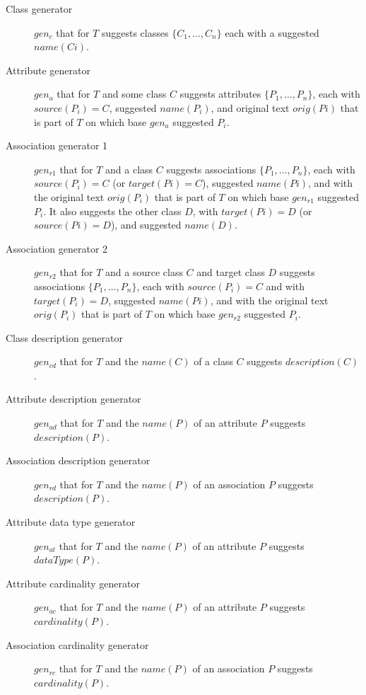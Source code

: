 \begin{description}
\item [Class generator] $gen_c$ that for $T$ suggests classes $\{C_1, \ldots, C_n\}$ each with a suggested $name(Ci)$.

\item [Attribute generator] $gen_a$ that for $T$ and some class $C$ suggests attributes $\{P_1, \ldots, P_n\}$, each with $source(P_i) = C$, suggested $name(P_i)$, and original text $orig(Pi)$ that is part of $T$ on which base $gen_a$ suggested $P_i$.

\item [Association generator 1] $gen_{r1}$ that for $T$ and a class $C$ suggests associations $\{P_1, \ldots, P_n\}$, each with $source(P_i) = C$ (or $target(Pi) = C$), suggested $name(Pi)$, and with the original text $orig(P_i)$ that is part of $T$ on which base $gen_{r1}$ suggested $P_i$. It also suggests the other class $D$, with $target(Pi)= D$ (or $source(Pi) = D$), and suggested $name(D)$.

\item [Association generator 2] $gen_{r2}$ that for $T$ and a source class $C$ and target class $D$ suggests associations $\{P_1, \ldots, P_n\}$, each with $source(P_i) = C$ and with $target(P_i) = D$, suggested $name(Pi)$, and with the original text $orig(P_i)$ that is part of $T$ on which base $gen_{r2}$ suggested $P_i$.

\item [Class description generator] $gen_{cd}$ that for $T$ and the $name(C)$ of a class $C$ suggests $description(C)$.

\item [Attribute description generator] $gen_{ad}$ that for $T$ and the $name(P)$ of an attribute $P$ suggests $description(P)$.

\item [Association description generator] $gen_{rd}$ that for $T$ and the $name(P)$ of an association $P$ suggests $description(P)$.

\item [Attribute data type generator] $gen_{at}$ that for $T$ and the $name(P)$ of an attribute $P$ suggests $dataType(P)$.

\item [Attribute cardinality generator] $gen_{ac}$ that for $T$ and the $name(P)$ of an attribute $P$ suggests $cardinality(P)$.

\item [Association cardinality generator] $gen_{rc}$ that for $T$ and the $name(P)$ of an association $P$ suggests $cardinality(P)$.


\end{description}
